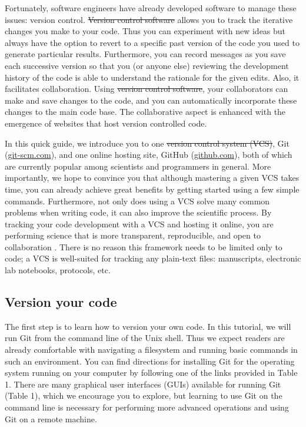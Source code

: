 \documentclass[10pt]{article}
\providecommand{\DIFaddtex}[1]{{\protect\color{blue}\uwave{#1}}} %
\providecommand{\DIFdeltex}[1]{{\protect\color{red}\sout{#1}}}                      %
\providecommand{\DIFaddbegin}{} %
\providecommand{\DIFaddend}{} %
\providecommand{\DIFdelbegin}{} %
\providecommand{\DIFdelend}{} %
\providecommand{\DIFadd}[1]{\texorpdfstring{\DIFaddtex{#1}}{#1}} %
\providecommand{\DIFdel}[1]{\texorpdfstring{\DIFdeltex{#1}}{}} %
\begin{document}
Fortunately, software engineers have already developed software to manage these issues: version control. 
\DIFdelbegin \DIFdel{Version control software }\DIFdelend \DIFaddbegin \DIFadd{A version control system (VCS) }\DIFaddend allows you to track the iterative changes you make to your code.
Thus you can experiment with new ideas but always have the option to revert to a specific past version of the code you used to generate particular results.
Furthermore, you can record messages as you save each successive version so that you (or anyone else) reviewing the development history of the code is able to understand the rationale for the given edits.
Also, it facilitates collaboration.
Using \DIFdelbegin \DIFdel{version control software}\DIFdelend \DIFaddbegin \DIFadd{a VCS}\DIFaddend , your collaborators can make and save changes to the code, and you can automatically incorporate these changes to the main code base.
The collaborative aspect is enhanced with the emergence of websites that host version controlled code.

In this quick guide, we introduce you to one \DIFdelbegin \DIFdel{version control system (VCS)}\DIFdelend \DIFaddbegin \DIFadd{VCS}\DIFaddend , Git (\href{http://git-scm.com/}{git-scm.com}), and one online hosting site, GitHub (\href{https://github.com}{github.com}), both of which are currently popular among scientists and programmers in general.
More importantly, we hope to convince you that although mastering a given VCS takes time, you can already achieve great benefits by getting started using a few simple commands.
Furthermore, not only does using a VCS solve many common problems when writing code, it can also improve the scientific process.
By tracking your code development with a VCS and hosting it online, you are performing science that is more transparent, reproducible, and open to collaboration \cite{23448176, 24415924}.
There is no reason this framework needs to be limited only to code; a VCS is well-suited for tracking any plain-text files: manuscripts, electronic lab notebooks, protocols, etc.


\subsection{Version your code}

The first step is to learn how to version your own code.
In this tutorial, we will run Git from the command line of the Unix shell.
Thus we expect readers are already comfortable with navigating a filesystem and running basic commands in such an environment.
You can find directions for installing Git for the operating system running on your computer by following one of the links provided in Table 1.
There are many graphical user interfaces (GUIs) available for running Git (Table 1), which we encourage you to explore, but learning to use Git on the command line is necessary for performing more advanced operations and using Git on a remote machine.
\end{document}
